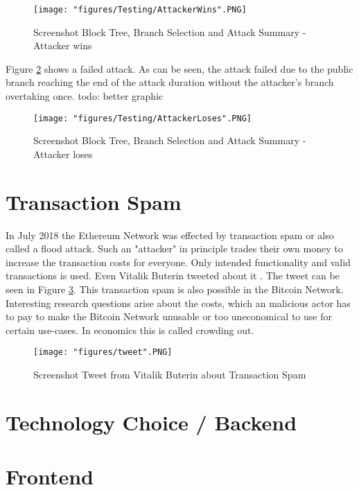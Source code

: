 \begin{figure}
\centering
\texttt{[image: "figures/Testing/AttackerWins".PNG]}
\caption{Screenshot Block Tree, Branch Selection and Attack Summary - Attacker wins
\label{fig:AttackerWins}}
\end{figure}

Figure \ref{fig:AttackerLoses} shows a failed attack. As can be seen, the attack failed due to the public branch reaching the end of the attack duration without the attacker's branch overtaking once.
todo: better graphic

\begin{figure}
\centering
\texttt{[image: "figures/Testing/AttackerLoses".PNG]}
\caption{Screenshot Block Tree, Branch Selection and Attack Summary - Attacker loses
\label{fig:AttackerLoses}}
\end{figure}

\section{Transaction Spam}
In July 2018 the Ethereum Network was effected by transaction spam or also called a flood attack. Such an "attacker" in principle trades their own money to increase the transaction costs for everyone. Only intended functionality and valid transactions is used. Even Vitalik Buterin tweeted about it \cite{tweet}. The tweet can be seen in Figure \ref{fig:transactionSpam}. This transaction spam is also possible in the Bitcoin Network. Interesting research questions arise about the costs, which an malicious actor has to pay to make the Bitcoin Network unusable or too uneconomical to use for certain use-cases. In economics this is called crowding out.

\begin{figure}
\centering
\texttt{[image: "figures/tweet".PNG]}
\caption{Screenshot Tweet from Vitalik Buterin about Transaction Spam
\label{fig:transactionSpam}}
\end{figure}

\section{Technology Choice / Backend}

\section{Frontend}

